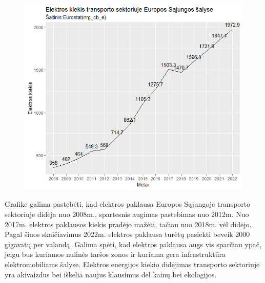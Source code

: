 \documentclass[12pt, titlepage]{article}
\begin{document}
\newpage
\begin{figure}[h]
\centering
\includegraphics[scale=1]{elektra.png}
\end{figure}

Grafike galima pastebėti, kad elektros paklausa Europos Sąjungoje transporto sektoriuje didėja nuo 2008m., spartesnis augimas pastebimas nuo 2012m. Nuo 2017m. elektros paklausos kiekis pradėjo mažėti, tačiau nuo 2018m. vėl didėjo. Pagal šiuos skaičiavimus 2022m. elektros paklausa turėtų pasiekti beveik 2000 gigavatų per valandą. Galima spėti, kad elektros paklausa augs vis sparčiau ypač, jeigu bus kuriamos nulinės taršos zonos ir kuriama gera infrastruktūra elektromobiliams šalyse. Elektros energijos kiekio didėjimas transporto sektoriuje yra akivaizdus bei iškelia naujus klausimus dėl kainų bei ekologijos.
\end{document}
